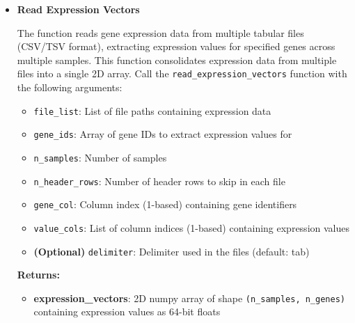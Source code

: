 \documentclass[11pt]{article}
\begin{document}
\begin{enumerate}
\begin{itemize}
	      	      \begin{lstlisting}[language=Python, caption={Python Read Gene IDs from TSV File}]
gene_ids = read_gene_ids_from_tsv_file(filename, n_genes,
                            gene_ids_len, n_header_rows, gene_col)
	      	      \end{lstlisting}
	      	      
	      	\item \textbf{Read Expression Vectors}
	      	      
	      	      The function reads gene expression data from multiple tabular files (CSV/TSV
	      	      format), extracting expression values for specified genes across
	      	      multiple samples. This function consolidates expression data from multiple
	      	      files into a single 2D array. Call the \texttt{read\_expression\_vectors}
	      	      function with the following arguments:
	      	      
	      	      \begin{itemize}
	      	      	\item \texttt{file\_list}: List of file paths containing expression data
	      	      	      
	      	      	\item \texttt{gene\_ids}: Array of gene IDs to extract expression values
	      	      	      for
	      	      	      
	      	      	\item \texttt{n\_samples}: Number of samples
	      	      	      
	      	      	\item \texttt{n\_header\_rows}: Number of header rows to skip in each
	      	      	      file
	      	      	      
	      	      	\item \texttt{gene\_col}: Column index (1-based) containing gene identifiers
	      	      	      
	      	      	\item \texttt{value\_cols}: List of column indices (1-based) containing
	      	      	      expression values
	      	      	      
	      	      	\item \textbf{(Optional)} \texttt{delimiter}: Delimiter used in the
	      	      	      files (default: tab)
	      	      \end{itemize}
	      	      
	      	      \textbf{Returns:}
	      	      \begin{itemize}
	      	      	\item \textbf{expression\_vectors}: 2D numpy array of shape \texttt{(n\_samples,
	      	      	      n\_genes)} containing expression values as 64-bit floats
	      	      \end{itemize}
	      	      

\end{itemize}
\end{enumerate}
\end{document}
